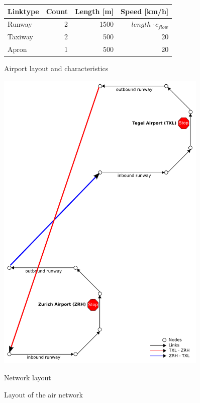 \begin{figure}[t]
\begin{minipage}{0.5\linewidth}
			\footnotesize
			\begin{tabular}{@{}lrrr@{}}
				Linktype & Count & Length [m] & Speed [km/h] \\
				\hline
				Runway   	& 2					& 1500		& $length \cdot c_{flow} $  	\\ %
				Taxiway   	& 2					& 500		& 20  	\\
				Apron   		& 1					& 500		& 20  	\\
				\end{tabular}		
				\vspace{1.4cm}
				\caption{Airport layout and characteristics}
				\label{fig:matsim_airport}
	\end{minipage}
	\begin{minipage}{0.5\linewidth}
		\centering
		\includegraphics[width=0.9\textwidth]{extending/figures/air/sf_airport_network_no_slide.pdf}
		\caption{Network layout}
		\label{fig:matsim_network_model}
	\end{minipage}
  \caption{Layout of the air network}
	\label{fig:air_network}
\end{figure}

